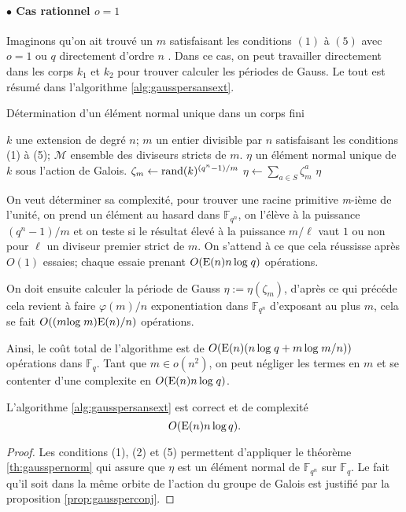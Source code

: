 \documentclass[a4paper]{article} %
\numberwithin{section}{part}
\numberwithin{equation}{section}
\newcommand\nroot[1]{\textit{#1}-ième}
\newcommand\GF[1]{\mathbb{F}_{#1}}
\newcommand\E[1]{\textup{E}(#1)}
\begin{document}
\paragraph{$\bullet$ Cas rationnel $o = 1$}
Imaginons qu'on ait trouvé un $m$ satisfaisant les conditions $(1)$ à $(5)$ avec
$o = 1$ ou $q$ directement d'ordre $n$ . Dans ce cas, on peut travailler 
directement dans les corps $k_1$ et $k_2$ pour trouver calculer les périodes de
Gauss. Le tout est résumé dans l'algorithme \ref{alg:gausspersansext}.

\begin{algorithm}
\caption{Détermination d'un élément normal unique dans un corps fini}
\label{alg:gausspersansext}
\begin{algorithmic}[1]
\REQUIRE $k$ une extension de degré $n$; $m$ un entier divisible par $n$
satisfaisant les conditions (1) à (5); $\mathcal{M}$ ensemble des diviseurs
stricts de $m$.
\ENSURE $\eta$ un élément normal unique de $k$ sous l'action de Galois.
\bigskip
\REPEAT
    \STATE $\zeta_m \leftarrow \textup{rand}(k)^{(q^n - 1)/m}$
\STATE $\eta \leftarrow \sum_{a\in S}{\zeta_m^a}$
\RETURN $\eta$
\end{algorithmic}
\end{algorithm}
On veut déterminer sa complexité, pour trouver une racine primitive 
\nroot{m} de l'unité, on prend un élément au hasard dans $\GF{q^n}$, on l'élève 
à la puissance $(q^n - 1)/m$ et on teste si le résultat élevé à la puissance 
$m/\ell$ vaut $1$ ou non pour $\ell$ un diviseur premier strict de $m$. On 
s'attend à ce que cela réussisse après $O(1)$ essaies; chaque essaie prenant 
$O(\E{n}n\,\textup{log\;}q)$ opérations.\par
On doit ensuite calculer la période de Gauss $\eta := \eta(\zeta_m)$,
d'après ce qui précéde cela revient à faire $\varphi(m)/n$ exponentiation dans
$\GF{q^n}$ d'exposant au plus $m$, cela se fait $O((m\textup{log\;}m)\E{n}/n)$
opérations.\par
Ainsi, le coût total de l'algorithme est de $O(\E{n}(n\,\textup{log\;}q +
m\,\textup{log\;}m/n))$ opérations dans $\GF{q}$. Tant que $m\in o(n^2)$, on 
peut négliger les termes en $m$ et se contenter d'une complexite en 
$O(\E{n}n\,\textup{log\;}q)$.

\begin{prop}
\label{prop:algsansext}
L'algorithme \ref{alg:gausspersansext} est correct et de complexité
\begin{equation}
O(\E{n}n\,\textup{log\,}q).
\end{equation}
\end{prop}
\begin{proof}
Les conditions (1), (2) et (5) permettent d'appliquer le théorème 
\ref{th:gausspernorm} qui assure que $\eta$ est un élément normal de 
$\GF{q^n}$ sur $\GF{q}$. Le fait qu'il soit dans la même orbite de l'action du
groupe de Galois est justifié par la proposition \ref{prop:gaussperconj}.
\end{proof}
\end{document}
